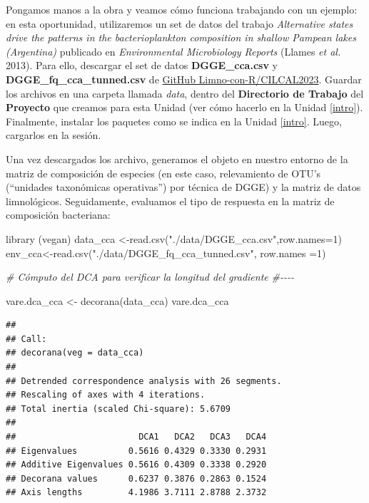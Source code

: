 \documentclass[
]{book}
\newenvironment{Shaded}{\begin{snugshade}}{\end{snugshade}}
\newcommand{\AttributeTok}[1]{\textcolor[rgb]{0.77,0.63,0.00}{#1}}
\newcommand{\CommentTok}[1]{\textcolor[rgb]{0.56,0.35,0.01}{\textit{#1}}}
\newcommand{\DecValTok}[1]{\textcolor[rgb]{0.00,0.00,0.81}{#1}}
\newcommand{\FunctionTok}[1]{\textcolor[rgb]{0.00,0.00,0.00}{#1}}
\newcommand{\NormalTok}[1]{#1}
\newcommand{\OtherTok}[1]{\textcolor[rgb]{0.56,0.35,0.01}{#1}}
\newcommand{\StringTok}[1]{\textcolor[rgb]{0.31,0.60,0.02}{#1}}
\begin{document}
Pongamos manos a la obra y veamos cómo funciona trabajando con un ejemplo: en esta oportunidad, utilizaremos un set de datos del trabajo \emph{Alternative states drive the patterns in the bacterioplankton composition in shallow Pampean lakes (Argentina)} publicado en \emph{Environmental Microbiology Reports} (Llames \emph{et al.} 2013). Para ello, descargar el set de datos \textbf{DGGE\_cca.csv} y \textbf{DGGE\_fq\_cca\_tunned.csv} de \href{https://github.com/Limno-con-R/CILCAL2023/tree/main/datasets}{GitHub Limno-con-R/CILCAL2023}.
Guardar los archivos en una carpeta llamada \emph{data}, dentro del \textbf{Directorio de Trabajo} del \textbf{Proyecto} que creamos para esta Unidad (ver cómo hacerlo en la Unidad \ref{intro}). Finalmente, instalar los paquetes como se indica en la Unidad \ref{intro}. Luego, cargarlos en la sesión.

Una vez descargados los archivo, generamos el objeto en nuestro entorno de la matriz de composición de especies (en este caso, relevamiento de OTU's (``unidades taxonómicas operativas'') por técnica de DGGE) y la matriz de datos limnológicos. Seguidamente, evaluamos el tipo de respuesta en la matriz de composición bacteriana:

\begin{Shaded}
\begin{Highlighting}[]
\FunctionTok{library}\NormalTok{ (vegan)}
\NormalTok{data\_cca }\OtherTok{\textless{}{-}}\FunctionTok{read.csv}\NormalTok{(}\StringTok{"./data/DGGE\_cca.csv"}\NormalTok{,}\AttributeTok{row.names=}\DecValTok{1}\NormalTok{)}
\NormalTok{env\_cca}\OtherTok{\textless{}{-}}\FunctionTok{read.csv}\NormalTok{(}\StringTok{"./data/DGGE\_fq\_cca\_tunned.csv"}\NormalTok{, }\AttributeTok{row.names =}\DecValTok{1}\NormalTok{)}
\end{Highlighting}
\end{Shaded}

\begin{Shaded}
\begin{Highlighting}[]
\CommentTok{\# Cómputo del DCA para verificar la longitud del gradiente}
\CommentTok{\#{-}{-}{-}{-}}

\NormalTok{vare.dca\_cca }\OtherTok{\textless{}{-}} \FunctionTok{decorana}\NormalTok{(data\_cca)}
\NormalTok{vare.dca\_cca}
\end{Highlighting}
\end{Shaded}

\begin{verbatim}
## 
## Call:
## decorana(veg = data_cca) 
## 
## Detrended correspondence analysis with 26 segments.
## Rescaling of axes with 4 iterations.
## Total inertia (scaled Chi-square): 5.6709 
## 
##                        DCA1   DCA2   DCA3   DCA4
## Eigenvalues          0.5616 0.4329 0.3330 0.2931
## Additive Eigenvalues 0.5616 0.4309 0.3338 0.2920
## Decorana values      0.6237 0.3876 0.2863 0.1524
## Axis lengths         4.1986 3.7111 2.8788 2.3732
\end{verbatim}
\end{document}
